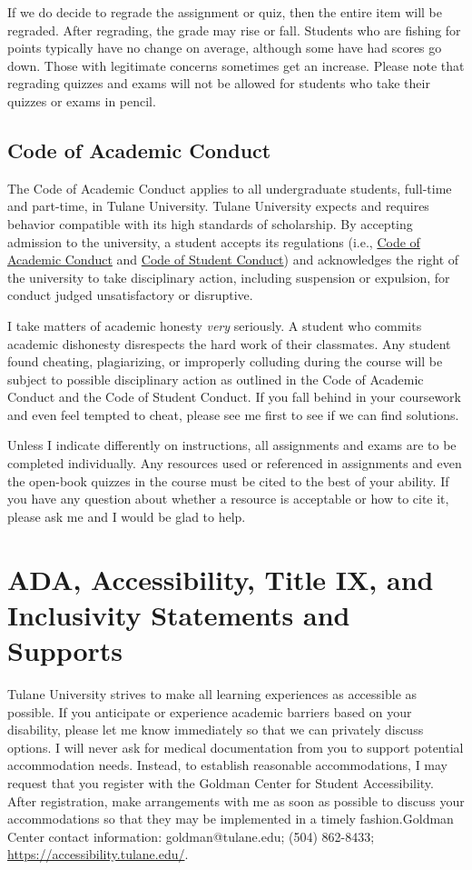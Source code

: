 \documentclass[11pt,letterpaper,final]{article}
\begin{document}
If we do decide to regrade the assignment or quiz, then the entire item will be regraded. After regrading, the grade may rise or fall. Students who are fishing for points typically have no change on average, although some have had scores go down. Those with legitimate concerns sometimes get an increase. Please note that regrading quizzes and exams will not be allowed for students who take their quizzes or exams in pencil.

\subsection{Code of Academic Conduct} 
The Code of Academic Conduct applies to all undergraduate students, full-time and part-time, in Tulane University. Tulane University expects and requires behavior compatible with its high standards of scholarship. By accepting admission to the university, a student accepts its regulations (i.e., \href{https://college.tulane.edu/code-of-academic-conduct}{Code of Academic Conduct} and \href{https://conduct.tulane.edu/resources/code-student-conduct}{Code of Student Conduct}) and acknowledges the right of the university to take disciplinary action, including suspension or expulsion, for conduct judged unsatisfactory or disruptive.

I take matters of academic honesty \textit{very} seriously. A student who commits academic dishonesty disrespects the hard work of their classmates. Any student found cheating, plagiarizing, or improperly colluding during the course will be subject to possible disciplinary action as outlined in the Code of Academic Conduct and the Code of Student Conduct. If you fall behind in your coursework and even feel tempted to cheat, please see me first to see if we can find solutions.

Unless I indicate differently on instructions, all assignments and exams are to be completed individually. Any resources used or referenced in assignments and even the open-book quizzes in the course must be cited to the best of your ability. If you have any question about whether a resource is acceptable or how to cite it, please ask me and I would be glad to help. 

\section{ADA, Accessibility, Title IX, and Inclusivity Statements and Supports} 
Tulane University strives to make all learning experiences as accessible as possible. If you anticipate or experience academic barriers based on your disability, please let me know immediately so that we can privately discuss options. I will never ask for medical documentation from you to support potential accommodation needs. Instead, to establish reasonable accommodations, I may request that you register with the Goldman Center for Student Accessibility. After registration, make arrangements with me as soon as possible to discuss your accommodations so that they may be implemented in a timely fashion.Goldman Center contact information: goldman@tulane.edu; (504) 862-8433; \url{https://accessibility.tulane.edu/}. 
\end{document}
